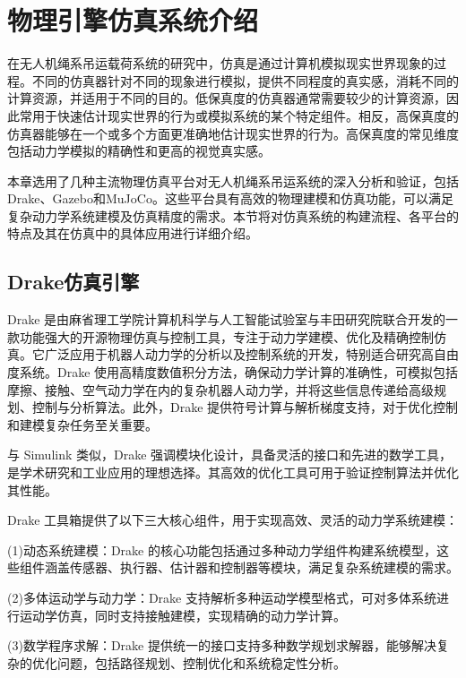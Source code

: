 \documentclass[lang=chs, degree=master, blindreview=true, winfonts=true]{yanputhesis}
\begin{document}
\section{物理引擎仿真系统介绍}
在无人机绳系吊运载荷系统的研究中，仿真是通过计算机模拟现实世界现象的过程。不同的仿真器针对不同的现象进行模拟，提供不同程度的真实感，消耗不同的计算资源，并适用于不同的目的。低保真度的仿真器通常需要较少的计算资源，因此常用于快速估计现实世界的行为或模拟系统的某个特定组件。相反，高保真度的仿真器能够在一个或多个方面更准确地估计现实世界的行为。高保真度的常见维度包括动力学模拟的精确性和更高的视觉真实感。

本章选用了几种主流物理仿真平台对无人机绳系吊运系统的深入分析和验证，包括Drake、Gazebo和MuJoCo。这些平台具有高效的物理建模和仿真功能，可以满足复杂动力学系统建模及仿真精度的需求。本节将对仿真系统的构建流程、各平台的特点及其在仿真中的具体应用进行详细介绍。



\subsection{Drake仿真引擎}

Drake 是由麻省理工学院计算机科学与人工智能试验室与丰田研究院联合开发的一款功能强大的开源物理仿真与控制工具，专注于动力学建模、优化及精确控制仿真。它广泛应用于机器人动力学的分析以及控制系统的开发，特别适合研究高自由度系统。Drake 使用高精度数值积分方法，确保动力学计算的准确性，可模拟包括摩擦、接触、空气动力学在内的复杂机器人动力学，并将这些信息传递给高级规划、控制与分析算法。此外，Drake 提供符号计算与解析梯度支持，对于优化控制和建模复杂任务至关重要。

与 Simulink 类似，Drake 强调模块化设计，具备灵活的接口和先进的数学工具，是学术研究和工业应用的理想选择。其高效的优化工具可用于验证控制算法并优化其性能。

Drake 工具箱提供了以下三大核心组件，用于实现高效、灵活的动力学系统建模：

(1)动态系统建模：Drake 的核心功能包括通过多种动力学组件构建系统模型，这些组件涵盖传感器、执行器、估计器和控制器等模块，满足复杂系统建模的需求。

(2)多体运动学与动力学：Drake 支持解析多种运动学模型格式，可对多体系统进行运动学仿真，同时支持接触建模，实现精确的动力学计算。

(3)数学程序求解：Drake 提供统一的接口支持多种数学规划求解器，能够解决复杂的优化问题，包括路径规划、控制优化和系统稳定性分析。
\end{document}
